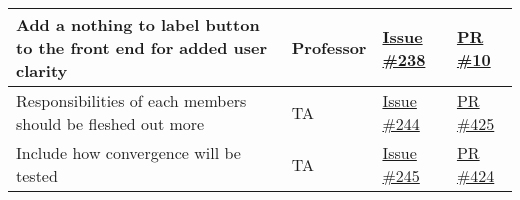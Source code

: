 \documentclass{article}
\begin{document}
\begin{longtable}{|p{5cm}|p{1.5cm}|p{2cm}|p{5cm}|}
Add a nothing to label button to the front end for added user clarity & Professor & \href{https://github.com/OKKM-insights/OKKM.insights/issues/238}{Issue \#238} & \href{https://github.com/OKKM-insights/frontend/pull/10}{PR \#10} \\ \hline
Responsibilities of each members should be fleshed out more & TA & \href{https://github.com/OKKM-insights/OKKM.insights/issues/244}{Issue \#244} & \href{https://github.com/OKKM-insights/OKKM.insights/pull/425}{PR \#425} \\ \hline
Include how convergence will be tested & TA & \href{https://github.com/OKKM-insights/OKKM.insights/issues/245}{Issue \#245} & \href{https://github.com/OKKM-insights/OKKM.insights/pull/424}{PR \#424} \\ \hline


\end{longtable}
\end{document}
